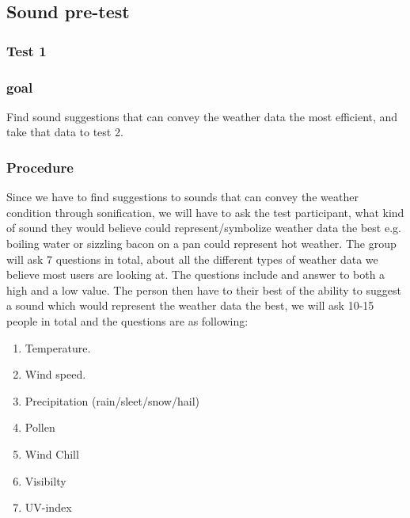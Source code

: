 

\subsection{Sound pre-test} %
\label{sub:sound_pre_test}

\subsubsection{Test 1} %
\label{ssub:test_1}

\subsubsection*{goal} %
\label{ssub:test_1_goal}

Find sound suggestions that can convey the weather data the most efficient, and take that data to test 2.


\subsubsection*{Procedure} %
\label{ssub:test_1_procedure}

Since we have to find suggestions to sounds that can convey the weather condition through sonification, we will have to ask the test participant, what kind of sound they would believe could represent/symbolize weather data the best e.g. boiling water or sizzling bacon on a pan could represent hot weather. 
The group will ask 7 questions in total, about all the different types of weather data we believe most users are looking at.
The questions include and answer to both a high and a low value. 
The person then have to their best of the ability to suggest a sound which would represent the weather data the best, we will ask 10-15 people in total and the questions are as following:

\begin{enumerate}
    \item Temperature.
    \item Wind speed. 
    \item Precipitation (rain/sleet/snow/hail)
    \item Pollen
    \item Wind Chill
    \item Visibilty
    \item UV-index
\end{enumerate}

